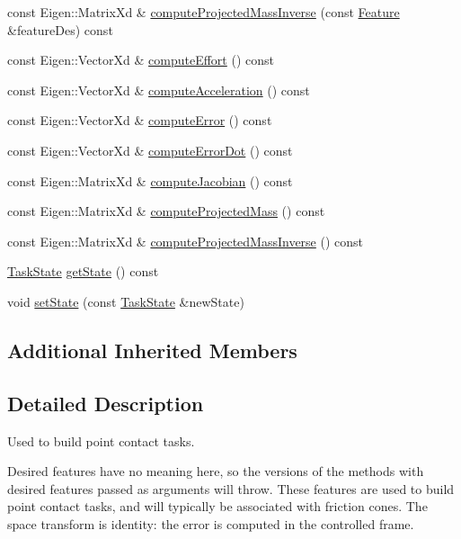 \begin{DoxyCompactItemize}
\item 
const Eigen\+::\+Matrix\+Xd \& \hyperlink{classocra_1_1PointContactFeature_a5425d1c3dfd4148e7adf6213e80291ba}{compute\+Projected\+Mass\+Inverse} (const \hyperlink{classocra_1_1Feature}{Feature} \&feature\+Des) const
\item 
const Eigen\+::\+Vector\+Xd \& \hyperlink{classocra_1_1PointContactFeature_ad925987e17dcfa0f8157deff33b9d311}{compute\+Effort} () const
\item 
const Eigen\+::\+Vector\+Xd \& \hyperlink{classocra_1_1PointContactFeature_a4266a665917b98bb507c4047c9bf6c0c}{compute\+Acceleration} () const
\item 
const Eigen\+::\+Vector\+Xd \& \hyperlink{classocra_1_1PointContactFeature_ab8504be30483fdcbeb25f9003a34471b}{compute\+Error} () const
\item 
const Eigen\+::\+Vector\+Xd \& \hyperlink{classocra_1_1PointContactFeature_a536bd532919a1a7f37a97aed625112b1}{compute\+Error\+Dot} () const
\item 
const Eigen\+::\+Matrix\+Xd \& \hyperlink{classocra_1_1PointContactFeature_a969bbe345edbcf6abecdd863630faa3f}{compute\+Jacobian} () const
\item 
const Eigen\+::\+Matrix\+Xd \& \hyperlink{classocra_1_1PointContactFeature_a04933fcbcc63eee1d7dbf926a0cbca8a}{compute\+Projected\+Mass} () const
\item 
const Eigen\+::\+Matrix\+Xd \& \hyperlink{classocra_1_1PointContactFeature_abb683382f022909cc02396e50be9328f}{compute\+Projected\+Mass\+Inverse} () const
\item 
\hyperlink{classocra_1_1TaskState}{Task\+State} \hyperlink{classocra_1_1PointContactFeature_a314df3ffae28a0be71d75317e1f56ab8}{get\+State} () const
\item 
void \hyperlink{classocra_1_1PointContactFeature_ae51b5ff581c698fd63048fbbd964c567}{set\+State} (const \hyperlink{classocra_1_1TaskState}{Task\+State} \&new\+State)
\end{DoxyCompactItemize}
\subsection*{Additional Inherited Members}


\subsection{Detailed Description}
Used to build point contact tasks. 

Desired features have no meaning here, so the versions of the methods with desired features passed as arguments will throw. These features are used to build point contact tasks, and will typically be associated with friction cones. The space transform is identity\+: the error is computed in the controlled frame. 


